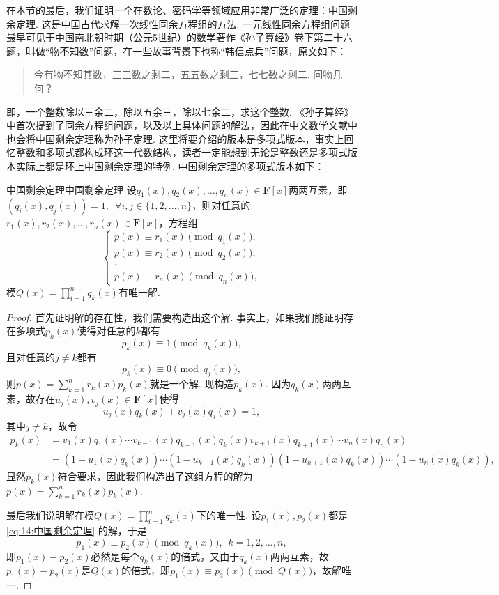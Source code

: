 在本节的最后，我们证明一个在数论、密码学等领域应用非常广泛的定理：中国剩余定理. 这是中国古代求解一次线性同余方程组的方法. 一元线性同余方程组问题最早可见于中国南北朝时期（公元5世纪）的数学著作《孙子算经》卷下第二十六题，叫做``物不知数''问题，在一些故事背景下也称``韩信点兵''问题，原文如下：
\begin{quotation}
    \kaishu
    今有物不知其数，三三数之剩二，五五数之剩三，七七数之剩二. 问物几何？
\end{quotation}
即，一个整数除以三余二，除以五余三，除以七余二，求这个整数. 《孙子算经》中首次提到了同余方程组问题，以及以上具体问题的解法，因此在中文数学文献中也会将中国剩余定理称为孙子定理. 这里将要介绍的版本是多项式版本，事实上回忆整数和多项式都构成环这一代数结构，读者一定能想到无论是整数还是多项式版本实际上都是环上中国剩余定理的特例. 中国剩余定理的多项式版本如下：
\begin{theorem}{中国剩余定理}{中国剩余定理}
    设$q_1(x),q_2(x),\ldots,q_n(x)\in\mathbf{F}[x]$两两互素，即$(q_i(x),q_j(x))=1,\enspace\forall i,j\in\{1,2,\ldots,n\}$，则对任意的$r_1(x),r_2(x),\ldots,r_n(x)\in\mathbf{F}[x]$，方程组
    \begin{equation} \label{eq:14:中国剩余定理}
        \begin{cases}
            p(x)\equiv r_1(x)\pmod{q_1(x)}, \\
            p(x)\equiv r_2(x)\pmod{q_2(x)}, \\
            \cdots                          \\
            p(x)\equiv r_n(x)\pmod{q_n(x)},
        \end{cases}
    \end{equation}
    模$Q(x)=\prod\limits_{i=1}^nq_k(x)$有唯一解.
\end{theorem}
\begin{proof}
    首先证明解的存在性，我们需要构造出这个解. 事实上，如果我们能证明存在多项式$p_k(x)$使得对任意的$k$都有
    \[p_k(x)\equiv 1\pmod{q_k(x)},\]
    且对任意的$j\neq k$都有
    \[p_k(x)\equiv 0\pmod{q_j(x)},\]
    则$p(x)=\sum\limits_{k=1}^nr_k(x)p_k(x)$就是一个解. 现构造$p_k(x)$. 因为$q_k(x)$两两互素，故存在$u_j(x),v_j(x)\in\mathbf{F}[x]$使得
    \[u_j(x)q_k(x)+v_j(x)q_j(x)=1,\]
    其中$j\neq k$，故令
    \begin{align*}
        p_k(x) & =v_1(x)q_1(x)\cdots v_{k-1}(x)q_{k-1}(x)q_k(x)v_{k+1}(x)q_{k+1}(x)\cdots v_n(x)q_n(x)  \\
               & =(1-u_1(x)q_k(x))\cdots(1-u_{k-1}(x)q_k(x))(1-u_{k+1}(x)q_k(x))\cdots(1-u_n(x)q_k(x)),
    \end{align*}
    显然$p_k(x)$符合要求，因此我们构造出了这组方程的解为$p(x)=\sum\limits_{k=1}^nr_k(x)p_k(x)$.

    最后我们说明解在模$Q(x)=\prod\limits_{i=1}^nq_k(x)$下的唯一性. 设$p_1(x),p_2(x)$都是\autoref{eq:14:中国剩余定理} 的解，于是
    \[p_1(x)\equiv p_2(x)\pmod{q_k(x)},\enspace k=1,2,\ldots,n,\]
    即$p_1(x)-p_2(x)$必然是每个$q_k(x)$的倍式，又由于$q_k(x)$两两互素，故$p_1(x)-p_2(x)$是$Q(x)$的倍式，即$p_1(x)\equiv p_2(x)\pmod{Q(x)}$，故解唯一.
\end{proof}

